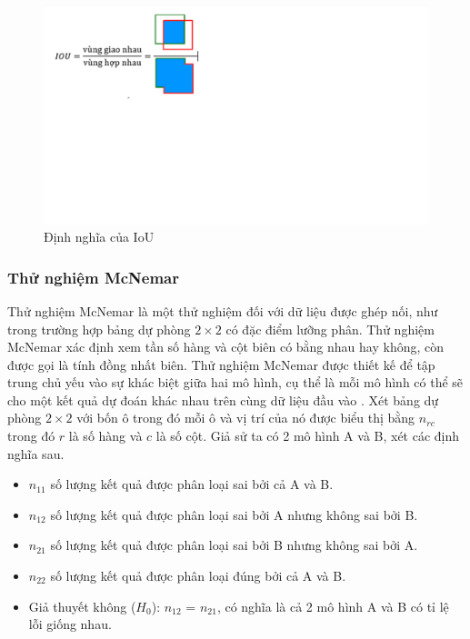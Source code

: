 \documentclass[../the.tex]{subfiles}
\begin{document}
\begin{figure}[ht!]
	\centering
	\includegraphics[width=1\textwidth]{images/IoU.PNG}
	\caption{Định nghĩa của IoU}
	\label{fig:IoU}
\end{figure}

\subsubsection*{Thử nghiệm McNemar}

Thử nghiệm McNemar \cite{McNemar1947} là một thử nghiệm đối với dữ liệu được ghép nối, như trong trường hợp bảng dự phòng $2 \times 2$ có đặc điểm lưỡng phân. Thử nghiệm McNemar xác định xem tần số hàng và cột biên có bằng nhau hay không, còn được gọi là tính đồng nhất biên. Thử nghiệm McNemar được thiết kế để tập trung chủ yếu vào sự khác biệt giữa hai mô hình, cụ thể là mỗi mô hình có thể sẽ cho một kết quả dự đoán khác nhau trên cùng dữ liệu đầu vào . Xét bảng dự phòng $2 \times 2$ với bốn ô trong đó mỗi ô và vị trí của nó được biểu thị bằng $n_{rc}$ trong đó $r$ là số hàng và $c$ là số cột. Giả sử ta có 2 mô hình A và B, xét các định nghĩa sau.

\begin {itemize}
\item $n_{11}$ số lượng kết quả được phân loại sai bởi cả A và B.
\item $n_{12}$ số lượng kết quả được phân loại sai bởi A nhưng không sai bởi B.
\item $n_{21}$ số lượng kết quả được phân loại sai bởi B nhưng không sai bởi A.
\item $n_{22}$ số lượng kết quả được phân loại đúng bởi cả A và B.
\item Giả thuyết không ($H_0$): $n_{12}$ = $n_{21}$, có nghĩa là cả 2 mô hình A và B có tỉ lệ lỗi giống nhau.
\end {itemize}
\end{document}

